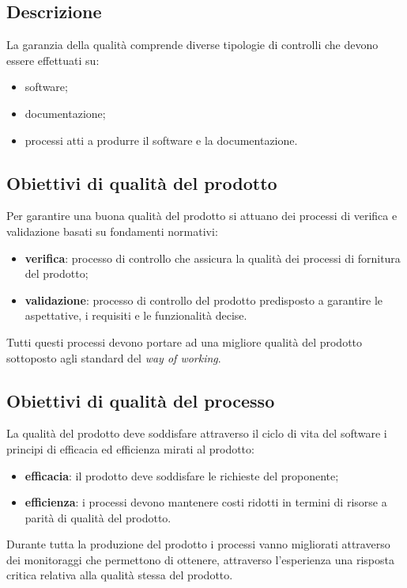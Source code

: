 \documentclass[]{article}
\begin{document}
					\subsection{Descrizione}
					La garanzia della qualità comprende diverse tipologie di controlli che devono essere effettuati su:
					\begin{itemize}
					\item software;
					\item documentazione;
					\item processi atti a produrre il software e la documentazione.						
					\end{itemize}	
				
					\subsection{Obiettivi di qualità del prodotto}	
					Per garantire una buona qualità del prodotto si attuano dei processi di verifica e validazione basati su fondamenti normativi:
					\begin{itemize}
					\item \textbf{verifica}: processo di controllo che assicura la qualità dei processi di fornitura del prodotto;
					\item \textbf{validazione}: processo di controllo del prodotto predisposto a garantire le aspettative, i requisiti e le funzionalità decise.
					\end{itemize}
					Tutti questi processi devono portare ad una migliore qualità del prodotto sottoposto agli standard del \textit{way of working}.
					
					
					\subsection{Obiettivi di qualità del processo}
					La qualità del prodotto deve soddisfare attraverso il ciclo di vita del software i principi di efficacia ed efficienza mirati al prodotto:
					\begin{itemize}
					\item \textbf{efficacia}: il prodotto deve soddisfare le richieste del proponente;
					\item \textbf{efficienza}: i processi devono mantenere costi ridotti in termini di risorse a parità di qualità del prodotto.
					\end{itemize}
					Durante tutta la produzione del prodotto i processi vanno migliorati attraverso dei monitoraggi che permettono di ottenere, attraverso l'esperienza  una risposta critica relativa alla qualità stessa del prodotto.							
					
\end{document}
